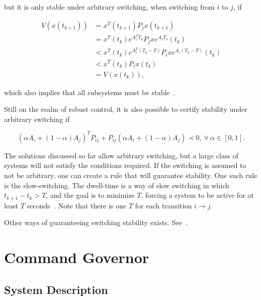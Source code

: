 but it is only stable under arbitrary switching, when switching from
\(i\) to \(j\), if

\begin{align}
	V(x(t_{k+1})) & = x^{T}(t_{k+1})P_{j}x(t_{k+1})                                     \\
	              & = x^{T}(t_{k})e^{A^{T}_{i}T_{k}}P_{j}xe^{A_{i}T_{k}}(t_{k})         \\
	              & < x^{T}(t_{k})e^{A^{T}_{i}(T_{k}-T)}P_{i}xe^{A_{i}(T_{k}-T)}(t_{k}) \\
	              & < x^{T}(t_{k})P_{i}x(t_{k})                                         \\
	              & = V(x(t_{k})),
\end{align}

which also implies that all subsystems must be
stable~\parencite{geromel.colaneri:stabilization}.

Still on the realm of robust control, it is also possible to certify stability
under arbitrary switching if~\parencite{liberzon.morse:basic}

\begin{equation}
	(\alpha{}A_{i}+(1-\alpha)A_{j})^{T}P_{ij}+P_{ij}(\alpha{}A_{i}+(1-\alpha)A_{j}) \prec{} 0,~\forall{}~\alpha{}\in{}[0,1].
\end{equation}

The solutions discussed so far allow arbitrary switching, but a large class of
systems will not satisfy the conditions required. If the switching is assumed to
not be arbitrary, one can create a rule that will guarantee stability. One such
rule is the slow-switching. The dwell-time is a way of slow switching in which
\(t_{k+1}-t_{k}>T\), and the goal is to minimize \(T\), forcing a system to be
active for at least \(T\)
seconds~\parencite{chesi.colaneri.ea:computing,franzè.lucia.ea:command,liberzon.morse:basic}.
Note that there is one \(T\) for each transition \(i\rightarrow{}j\).

Other ways of guaranteeing switching stability exists.
See~\textcite{geromel.deaecto:stability,liberzon.morse:basic,geromel.colaneri:stabilization}.

\section{Command Governor}%
\label{sec:command-governor}

\subsection{System Description}%
\label{subsec:system-description}

